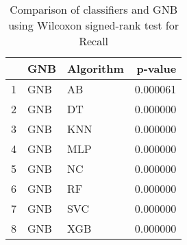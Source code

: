 \begin{table}
\footnotesize
\caption{Comparison of classifiers and GNB using Wilcoxon signed-rank test for Recall}
\label{tab:GNB wilcoxon Recall comparison}
\begin{tabular}{lllr}
\hline
 & GNB & Algorithm & p-value \\
\hline
1 & GNB & AB & 0.000061 \\
2 & GNB & DT & 0.000000 \\
3 & GNB & KNN & 0.000000 \\
4 & GNB & MLP & 0.000000 \\
5 & GNB & NC & 0.000000 \\
6 & GNB & RF & 0.000000 \\
7 & GNB & SVC & 0.000000 \\
8 & GNB & XGB & 0.000000 \\
\hline
\end{tabular}
\end{table}
